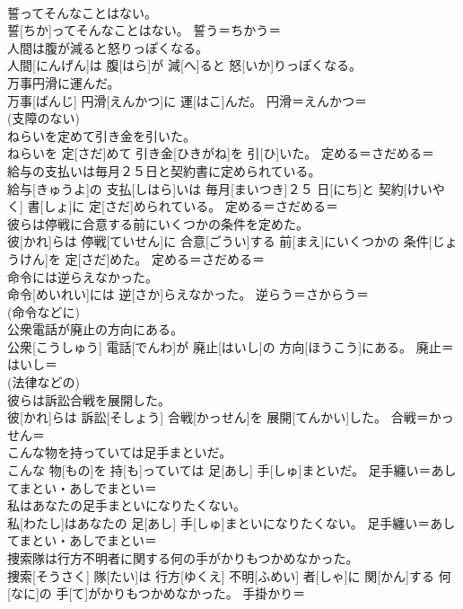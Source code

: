 \documentclass[8pt]{extreport}
\begin{document}
\begin{CJK}{UTF8}{min}
{\\	誓ってそんなことはない。	
\\	誓[ちか]ってそんなことはない。	誓う＝ちかう＝ 
\\	人間は腹が減ると怒りっぽくなる。	
\\	人間[にんげん]は 腹[はら]が 減[へ]ると 怒[いか]りっぽくなる。	
\\	万事円滑に運んだ。	
\\	万事[ばんじ] 円滑[えんかつ]に 運[はこ]んだ。	円滑＝えんかつ＝ 
\\	(支障のない) 
\\	ねらいを定めて引き金を引いた。	
\\	ねらいを 定[さだ]めて 引き金[ひきがね]を 引[ひ]いた。	定める＝さだめる＝ 
\\	給与の支払いは毎月２５日と契約書に定められている。	
\\	給与[きゅうよ]の 支払[しはら]いは 毎月[まいつき]２５ 日[にち]と 契約[けいやく] 書[しょ]に 定[さだ]められている。	定める＝さだめる＝ 
\\	彼らは停戦に合意する前にいくつかの条件を定めた。	
\\	彼[かれ]らは 停戦[ていせん]に 合意[ごうい]する 前[まえ]にいくつかの 条件[じょうけん]を 定[さだ]めた。	定める＝さだめる＝ 
\\	命令には逆らえなかった。	
\\	命令[めいれい]には 逆[さか]らえなかった。	逆らう＝さからう＝ 
\\	(命令などに) 
\\	公衆電話が廃止の方向にある。	
\\	公衆[こうしゅう] 電話[でんわ]が 廃止[はいし]の 方向[ほうこう]にある。	廃止＝はいし＝ 
\\	(法律などの) 
\\	彼らは訴訟合戦を展開した。	
\\	彼[かれ]らは 訴訟[そしょう] 合戦[かっせん]を 展開[てんかい]した。	合戦＝かっせん＝ 
\\	こんな物を持っていては足手まといだ。	
\\	こんな 物[もの]を 持[も]っていては 足[あし] 手[しゅ]まといだ。	足手纏い＝あしてまとい・あしでまとい＝ 
\\	私はあなたの足手まといになりたくない。	
\\	私[わたし]はあなたの 足[あし] 手[しゅ]まといになりたくない。	足手纏い＝あしてまとい・あしでまとい＝ 
\\	捜索隊は行方不明者に関する何の手がかりもつかめなかった。	
\\	捜索[そうさく] 隊[たい]は 行方[ゆくえ] 不明[ふめい] 者[しゃ]に 関[かん]する 何[なに]の 手[て]がかりもつかめなかった。	手掛かり＝ 
}
\end{CJK}
\end{document}
